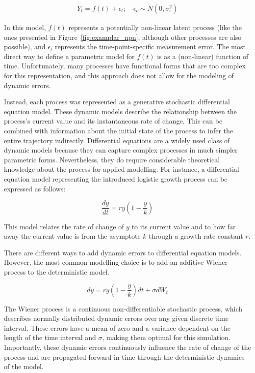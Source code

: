 \documentclass[man, floatsintext]{apa7}
\begin{document}
\begin{align}
  Y_t = f(t) + \epsilon_t; \quad \epsilon_t \sim N(0, \sigma^2_{\epsilon})
\end{align}

\noindent In this model, $f(t)$ represents a potentially non-linear latent
process (like the ones presented in Figure~\ref{fig:examplar_npn}, although
other processes are also possible), and $\epsilon_t$ represents the
time-point-specific measurement error. The most direct way to define a
parametric model for $f(t)$ is as a (non-linear) function of time.
Unfortunately, many processes have functional forms that are too complex for
this representation, and this approach does not allow for the modeling of
dynamic errors.

Instead, each process was represented as a generative stochastic differential
equation model. These dynamic models describe the relationship between the
process's current value and its instantaneous rate of change. This can be
combined with information about the initial state of the process to infer the
entire trajectory indirectly. Differential equations are a widely used class of
dynamic models because they can capture complex processes in much simpler
parametric forms. Nevertheless, they do require considerable theoretical
knowledge about the process for applied modelling. For instance, a differential
equation model representing the introduced logistic growth process can be
expressed as follows:

\begin{equation} \label{eq:2}
  \frac{dy}{dt} = r y (1-\frac{y}{k})
\end{equation}

\noindent This model relates the rate of change of $y$ to its current value and
to how far away the current value is from the asymptote $k$ through a growth
rate constant $r$.

There are different ways to add dynamic errors to differential equation models.
However, the most common modelling choice is to add an additive Wiener process
to the deterministic model.

\begin{equation}
  dy = r y (1-\frac{y}{k})dt + \sigma dW_t
\end{equation}

\noindent The Wiener process is a continuous non-differentiable stochastic
process, which describes normally distributed dynamic errors over any given
discrete time interval. These errors have a mean of zero and a variance
dependent on the length of the time interval and $\sigma$, making them optimal
for this simulation. Importantly, these dynamic errors continuously influence
the rate of change of the process and are propagated forward in time through
the deterministic dynamics of the model.
\end{document}
